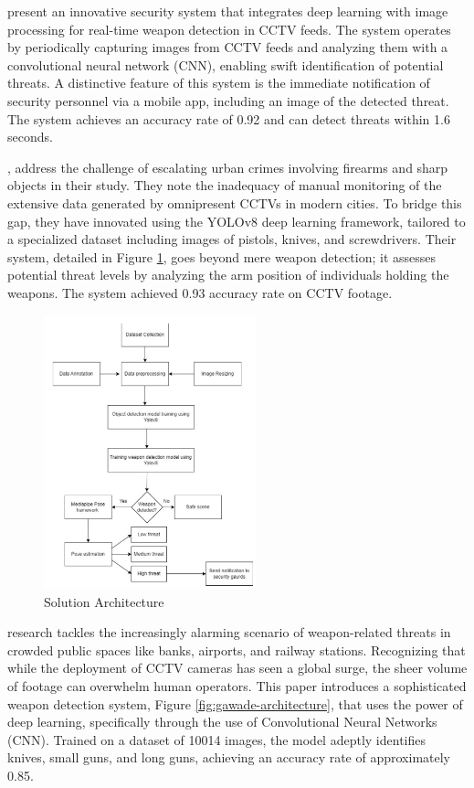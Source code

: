 \citet{rfc19} present an innovative security system that integrates deep learning with image processing for real-time weapon detection in CCTV feeds. The system operates by periodically capturing images from CCTV feeds and analyzing them with a convolutional neural network (CNN), enabling swift identification of potential threats. A distinctive feature of this system is the immediate notification of security personnel via a mobile app, including an image of the detected threat. The system achieves an accuracy rate of 0.92 and can detect threats within 1.6 seconds.

\citet{rfc17}, address the challenge of escalating urban crimes involving firearms and sharp objects in their study. They note the inadequacy of manual monitoring of the extensive data generated by omnipresent CCTVs in modern cities. To bridge this gap, they have innovated using the YOLOv8 deep learning framework, tailored to a specialized dataset including images of pistols, knives, and screwdrivers. Their system, detailed in Figure \ref{fig:safa-architecture}, goes beyond mere weapon detection; it assesses potential threat levels by analyzing the arm position of individuals holding the weapons. The system achieved 0.93 accuracy rate on CCTV footage.

\begin{figure}[h]
    \centering 
    \includegraphics[width=0.55\textwidth]{figs/safa-architecture.png} 
    \caption{\citet{rfc17} Solution Architecture}
    \label{fig:safa-architecture}
\end{figure}


\citet{rfc6} research tackles the increasingly alarming scenario of weapon-related threats in crowded public spaces like banks, airports, and railway stations. Recognizing that while the deployment of CCTV cameras has seen a global surge, the sheer volume of footage can overwhelm human operators. This paper introduces a sophisticated weapon detection system, Figure \ref{fig:gawade-architecture},  that uses the power of deep learning, specifically through the use of Convolutional Neural Networks (CNN). Trained on a dataset of 10014 images, the model adeptly identifies knives, small guns, and long guns, achieving an accuracy rate of approximately 0.85.

